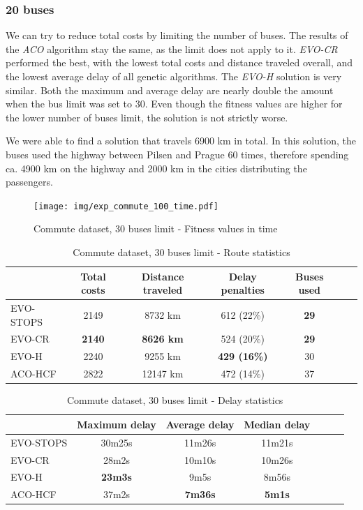 \subsubsection{20 buses}

We can try to reduce total costs by limiting the number of buses. The results of the \textit{ACO} algorithm stay the same, as the limit does not apply to it. \textit{EVO-CR} performed the best, with the lowest total costs and distance traveled overall, and the lowest average delay of all genetic algorithms. The \textit{EVO-H} solution is very similar. Both the maximum and average delay are nearly double the amount when the bus limit was set to 30. Even though the fitness values are higher for the lower number of buses limit, the solution is not strictly worse.

We were able to find a solution that travels 6900 km in total. In this solution, the buses used the highway between Pilsen and Prague 60 times, therefore spending ca. 4900 km on the highway and 2000 km in the cities distributing the passengers.

\clearpage

\begin{figure}
    \centering
    \texttt{[image: img/exp\_commute\_100\_time.pdf]}
    \caption{Commute dataset, 30 buses limit - Fitness values in time}
    \label{fig:exp_commute_30}
\end{figure}

\begin{table}
    \centering
    \begin{tabular}{lcccccc}
         & Total costs & Distance traveled & Delay penalties & Buses used \\
         \hline
         EVO-STOPS & 2149 & 8732 km & 612 (22\%) & \textbf{29} \\
         EVO-CR & \textbf{2140} & \textbf{8626 km} & 524 (20\%) & \textbf{29} \\
         EVO-H & 2240 & 9255 km & \textbf{429 (16\%)} & 30 \\
         ACO-HCF & 2822 & 12147 km & 472 (14\%) & 37 \\
    \end{tabular}
    \caption{Commute dataset, 30 buses limit - Route statistics}
    \label{tab:exp_commute_30_route_stats}
\end{table}

\begin{table}
    \centering
    \begin{tabular}{lcccccc}
         &  Maximum delay & Average delay & Median delay \\
         \hline
         EVO-STOPS & 30m25s & 11m26s & 11m21s \\
         EVO-CR & 28m2s & 10m10s & 10m26s \\
         EVO-H & \textbf{23m3s} & 9m5s & 8m56s \\
         ACO-HCF & 37m2s & \textbf{7m36s} & \textbf{5m1s} \\
    \end{tabular}
    \caption{Commute dataset, 30 buses limit - Delay statistics}
    \label{tab:exp_commute_30_delay_stats}
\end{table}

